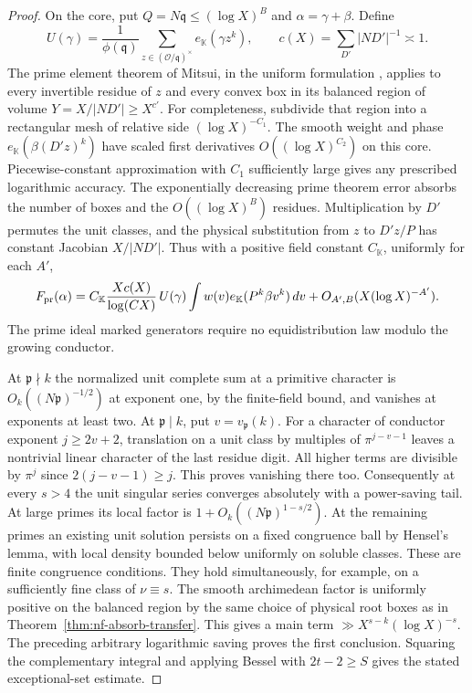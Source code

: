 \documentclass[11pt,letterpaper]{article}
\theoremstyle{definition}
\numberwithin{equation}{section}
\begin{document}
\begin{proof}
On the core, put $Q=N\mathfrak q\le(\log X)^B$ and
$\alpha=\gamma+\beta$. Define
\[
 U(\gamma)=\frac1{\phi(\mathfrak q)}
   \sum_{z\in(\mathcal O/\mathfrak q)^\times} e_{\mathbb K}(\gamma z^k),
 \qquad c(X)=\sum_{D'} |ND'|^{-1}\asymp1 .
\]
The prime element theorem of Mitsui, in the uniform formulation
\cite[Theorem~1.2.1]{nf3:kai}, applies to every invertible residue
of $z$ and every convex box in its balanced region of volume
$Y=X/|ND'|\ge X^{c'}$. For completeness, subdivide that region
into a rectangular mesh of relative side $(\log X)^{-C_1}$.
The smooth weight and phase $e_{\mathbb K}(\beta(D'z)^k)$ have
scaled first derivatives $O((\log X)^{C_2})$ on this core.
Piecewise-constant approximation with $C_1$ sufficiently large
gives any prescribed logarithmic accuracy. The exponentially
decreasing prime theorem error absorbs the number of boxes and
the $O((\log X)^B)$ residues. Multiplication by $D'$ permutes the
unit classes, and the physical substitution from $z$ to $D'z/P$
has constant Jacobian $X/|ND'|$. Thus with a positive field
constant $C_{\mathbb K}$, uniformly for each $A'$,
\[
 F_{\rm pr}(\alpha)=
     C_{\mathbb K}\frac{X c(X)}{\log(CX)}\,
       U(\gamma)\int w(v)e_{\mathbb K}(P^k\beta v^k)\,dv
          +O_{A',B}(X(\log X)^{-A'}).
\]
The prime ideal marked generators require no equidistribution law
modulo the growing conductor.

At $\mathfrak p\nmid k$ the normalized unit complete sum at a
primitive character is $O_k((N\mathfrak p)^{-1/2})$ at exponent
one, by the finite-field bound, and vanishes at exponents at least
two. At $\mathfrak p\mid k$, put $v=v_{\mathfrak p}(k)$.
For a character of conductor exponent $j\ge2v+2$, translation on a
unit class by multiples of $\pi^{j-v-1}$ leaves a nontrivial linear
character of the last residue digit. All higher terms are divisible
by $\pi^j$ since $2(j-v-1)\ge j$. This proves vanishing there too.
Consequently at every $s>4$ the unit singular series converges
absolutely with a power-saving tail. At large primes its local factor
is $1+O_k((N\mathfrak p)^{1-s/2})$. At the remaining primes an
existing unit solution persists on a fixed congruence ball by
Hensel's lemma, with local density bounded below uniformly on
soluble classes. These are finite congruence conditions. They hold
simultaneously, for example, on a sufficiently fine class of
$\nu\equiv s$. The smooth archimedean factor is uniformly positive
on the balanced region by the same choice of physical root boxes as
in Theorem~\ref{thm:nf-absorb-transfer}. This gives a main term
$\gg X^{s-k}(\log X)^{-s}$. The preceding arbitrary logarithmic
saving proves the first conclusion. Squaring the complementary
integral and applying Bessel with $2t-2\ge S$ gives the stated
exceptional-set estimate.


\end{proof}
\end{document}
